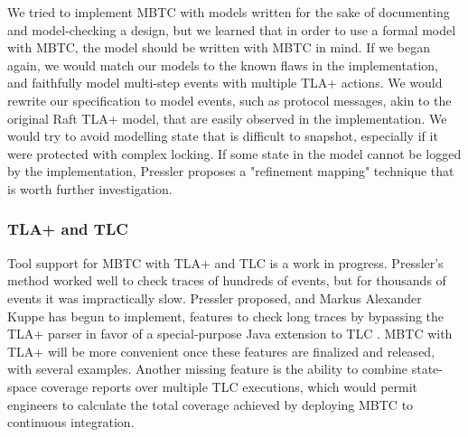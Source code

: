 \documentclass{vldb}
\begin{document}
We tried to implement MBTC with models written for the sake of documenting and model-checking a design, but we learned that in order to use a formal model with MBTC, the model should be written with MBTC in mind. 
If we began again, we would match our models to the known flaws in the implementation, and faithfully model multi-step events with multiple TLA+ actions.
We would rewrite our specification to model events, such as protocol messages, akin to the original Raft TLA+ model, that are easily observed in the implementation. 
We would try to avoid modelling state that is difficult to snapshot, especially if it were protected with complex locking.
If some state in the model cannot be logged by the implementation, Pressler proposes a "refinement mapping" technique \cite{Pressler18VerifyingSoftwareTracesTLAPlus} that is worth further investigation.

\subsubsection{TLA+ and TLC}
\label{subsubsec:mbtc_tla_tlc}

Tool support for MBTC with TLA+ and TLC is a work in progress. 
Pressler's method worked well to check traces of hundreds of events, but for thousands of events it was impractically slow. 
Pressler proposed, and Markus Alexander Kuppe has begun to implement, features to check long traces by bypassing the TLA+ parser in favor of a special-purpose Java extension to TLC \cite{TLAPlusIssue413}. 
MBTC with TLA+ will be more convenient once these features are finalized and released, with several examples. 
Another missing feature is the ability to combine state-space coverage reports over multiple TLC executions, which would permit engineers to calculate the total coverage achieved by deploying MBTC to continuous integration.






\end{document}
